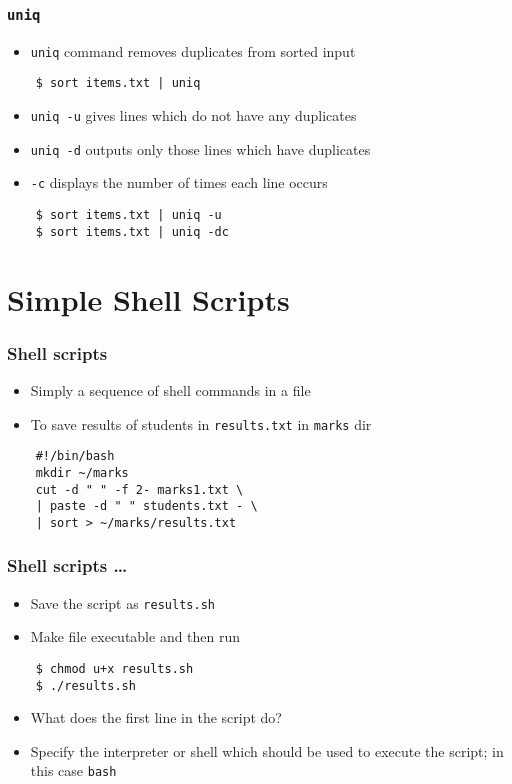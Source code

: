 \documentclass[12pt,compress]{beamer}
\newcounter{time}
\begin{document}
\begin{frame}[fragile]
  \frametitle{\texttt{uniq}}
  \begin{itemize}
  \item \texttt{uniq} command removes duplicates from \alert{sorted} input
  \end{itemize}
  \begin{lstlisting}
    $ sort items.txt | uniq
  \end{lstlisting} %
  \begin{itemize}
  \item \texttt{uniq -u} gives lines which do not have any duplicates
  \item \texttt{uniq -d} outputs only those lines which have duplicates
  \item \texttt{-c} displays the number of times each line occurs 
  \end{itemize}
  \begin{lstlisting}
    $ sort items.txt | uniq -u 
    $ sort items.txt | uniq -dc
  \end{lstlisting} %
\end{frame}

\section{Simple Shell Scripts}

\begin{frame}[fragile]
  \frametitle{Shell scripts}
  \begin{itemize}
  \item Simply a sequence of shell commands in a file
  \item To save results of students in \texttt{results.txt} in
    \texttt{marks} dir
  \end{itemize}
  \begin{lstlisting}
    #!/bin/bash
    mkdir ~/marks
    cut -d " " -f 2- marks1.txt \
    | paste -d " " students.txt - \
    | sort > ~/marks/results.txt
  \end{lstlisting} %
\end{frame}

\begin{frame}[fragile]
  \frametitle{Shell scripts \ldots}
  \begin{itemize}
  \item Save the script as \texttt{results.sh}
  \item Make file executable and then run
  \end{itemize}
  \begin{lstlisting}
    $ chmod u+x results.sh
    $ ./results.sh
  \end{lstlisting} %
  \begin{itemize}
  \item What does the first line in the script do?
  \item Specify the interpreter or shell which should be used to
    execute the script; in this case \texttt{bash}
  \end{itemize}
\end{frame}
\end{document}
